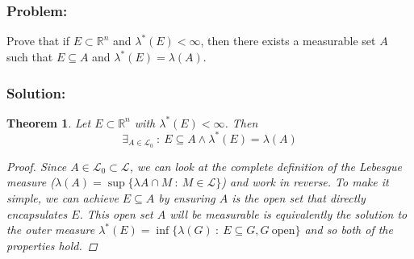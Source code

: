 \documentclass[]{article}
\newcommand{\R}{\mathbb{R}}
\newcommand{\st}{\ : \ }
\newtheorem{theorem}{Theorem}
\begin{document}
\newpage
\section{}
\subsubsection*{Problem:}
Prove that if $E \subset \R^n$ and $\lambda^*(E) < \infty$, then there exists a measurable set $A$ such that $E \subseteq A$ and $\lambda^*(E) = \lambda(A)$.
\subsubsection*{Solution:}
\begin{theorem}
    Let $E \subset \R^n$ with $\lambda^*(E) < \infty$.
    Then\[
        \exists_{A \in \mathcal{L}_0} \st E \subseteq A \land \lambda^*(E) = \lambda(A)
    \]\begin{proof}
        Since $A \in \mathcal{L}_0 \subset \mathcal{L}$, we can look at the complete definition of the Lebesgue measure 
        ($\lambda(A) = \sup\{\lambda{A \cap M} \st M \in \mathcal{L}\}$)
        and work in reverse. 
        To make it simple, we can achieve $E \subseteq A$ by ensuring $A$ is the open set that directly encapsulates $E$. 
        This open set $A$ will be measurable is equivalently the solution to the outer measure $\lambda^*(E) = \inf\{\lambda(G) \st E \subseteq G, G \ \text{open}\}$ and so both of the properties hold.
    \end{proof}
\end{theorem}
\end{document}
